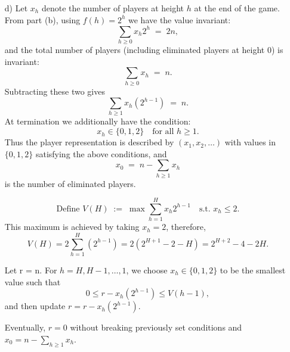 \documentclass[12pt]{article}
\newcommand{\tand}{\text{ and }}
\begin{document}
\begin{itemize}
\begin{proof}
        Since the current conditions in both the $S$ game and the $S'$ game are identical, it means that $x_{i_k} \geq 3 \tand x_{j_k} \geq 3$ and so both operations are valid. Therfore, there must exist an operation $T_{i_k}$ somewhere further down in $S'$ becuase $x_{i_k} \geq 3$ and the only operation which can decrease the number of players at $i_k is T_{i_k}$. We claim we can bring $T_{i_k}$ to the front by using Lemma 1. 

        We take the first instance of $T_{i_k}$ we find furhter down in $S'$. We compare it to the the operation directly in front of it and because this is the first isntance of $T_{i_k}$, the operation in front of it cannot also be $T_{i_k}$, but it is a valid move because $S'$ is a valid ordering. Therefore, we can switch the two operations. We can do this over and over again, until we bring $T_{i_k}$ to the front of $S'$ where it aligns with it's corresponding operation in $S$. 
        
        We can repeat this process with each difference in the two orderings as we iterate through them, until $S' = S$. Therfore, regardless of the order in which the competitions are held, it can be transformed into another target ordering via a series of switches due to the communatitve nature of the operations.
    \end{proof}

   Because any two valid terminating sequences can be transformed into each other by valid swapes, they must have the same count of each move and therefore the same number of competitions and the same final player count at each height.

    

    \item[d)]  Let $x_h$ denote the number of players at height $h$ at the end of the game.
    From part (b), using $f(h)=2^h$ we have the value invariant:
    \[
    \sum_{h\ge 0} x_h 2^h \;=\; 2n,
    \]
    and the total number of players (including eliminated players at height $0$) is invariant:
    \[
    \sum_{h\ge 0} x_h \;=\; n.
    \]
    Subtracting these two gives
    \[\sum_{h\ge 1} x_h(2^{h-1}) \;=\; n.\]
    At termination we additionally have the condition:
    \[
    x_h\in\{0,1,2\}\quad\text{for all }h\ge 1.
    \]
    Thus the player representation is described by
    $(x_1,x_2,\dots)$ with values in $\{0,1,2\}$ satisfying the above conditions, and
    \[
    x_0 \;=\; n-\sum_{h\ge 1} x_h
    \]
    is the number of eliminated players.
    
    \[
    \text{Define } V(H) \;:=\; \max \sum_{h=1}^H x_h 2^{h-1}
    \quad\text{s.t. } x_h\le 2.
    \]
    This maximum is achieved by taking $x_h=2$, therefore,
    \[
    V(H)=2\sum_{h=1}^H (2^{h-1})
    =2(2^{H+1}-2-H)
    =2^{H+2}-4-2H.
    \]
    
    Let r = n. For $h=H,H-1,\dots,1$, we choose $x_h\in\{0,1,2\}$ to be the
    smallest value such that
    \[
    0 \le r - x_h (2^{h-1}) \le V(h-1),
    \]
    and then update $r = r-x_h (2^{h-1})$.
    
    Eventually, $r=0$ without breaking previously set conditions and $x_0 = n-\sum_{h\ge 1} x_h$.
\end{itemize}
\end{document}
